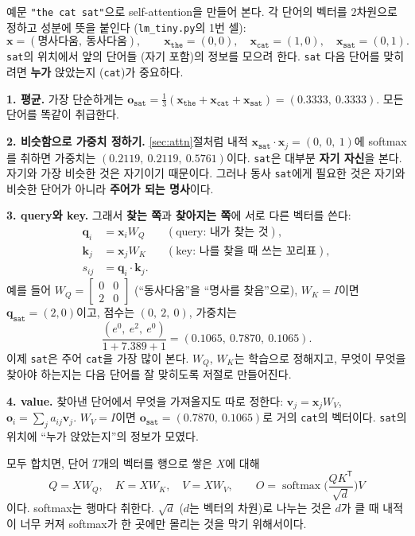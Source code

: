 \documentclass[11pt,a4paper]{article}
\newcommand{\vect}[1]{\bm{#1}}
\newcommand{\T}{^{\mathsf T}}
\newcommand{\softmax}{\operatorname{softmax}}
\newcommand{\w}[1]{\texttt{#1}}
\begin{document}
예문 \w{"the cat sat"}으로 self-attention을 만들어 본다. 각 단어의 벡터를 $2$차원으로 정하고 성분에 뜻을 붙인다 (\texttt{lm\_tiny.py}의 1번 셀):
\begin{equation}
\vect x=(\text{명사다움},\ \text{동사다움}),\qquad
\vect x_{\w{the}}=(0,0),\quad \vect x_{\w{cat}}=(1,0),\quad \vect x_{\w{sat}}=(0,1).
\end{equation}
\w{sat}의 위치에서 앞의 단어들 (자기 포함)의 정보를 모으려 한다. \w{sat} 다음 단어를 맞히려면 \textbf{누가} 앉았는지 (\w{cat})가 중요하다.

\textbf{1. 평균.} 가장 단순하게는 $\vect o_{\w{sat}}=\tfrac13(\vect x_{\w{the}}+\vect x_{\w{cat}}+\vect x_{\w{sat}})=(0.3333,\ 0.3333)$. 모든 단어를 똑같이 취급한다.

\textbf{2. 비슷함으로 가중치 정하기.} \ref{sec:attn}절처럼 내적 $\vect x_{\w{sat}}\cdot\vect x_j=(0,\ 0,\ 1)$에 softmax를 취하면 가중치는 $(0.2119,\ 0.2119,\ 0.5761)$이다.
\w{sat}은 대부분 \textbf{자기 자신}을 본다. 자기와 가장 비슷한 것은 자기이기 때문이다.
그러나 동사 \w{sat}에게 필요한 것은 자기와 비슷한 단어가 아니라 \textbf{주어가 되는 명사}이다.

\textbf{3. query와 key.} 그래서 \textbf{찾는 쪽}과 \textbf{찾아지는 쪽}에 서로 다른 벡터를 쓴다:
\begin{align}
\vect q_i&=\vect x_iW_Q &&(\text{query: 내가 찾는 것}),\\
\vect k_j&=\vect x_jW_K &&(\text{key: 나를 찾을 때 쓰는 꼬리표}),\\
s_{ij}&=\vect q_i\cdot\vect k_j .
\end{align}
예를 들어 $W_Q=\begin{bmatrix}0&0\\2&0\end{bmatrix}$ (``동사다움''을 ``명사를 찾음''으로), $W_K=I$이면 $\vect q_{\w{sat}}=(2,0)$이고, 점수는 $(0,\ 2,\ 0)$, 가중치는
\begin{equation}
\frac{(e^0,\ e^2,\ e^0)}{1+7.389+1}=(0.1065,\ 0.7870,\ 0.1065).
\end{equation}
이제 \w{sat}은 주어 \w{cat}을 가장 많이 본다. $W_Q$, $W_K$는 학습으로 정해지고, 무엇이 무엇을 찾아야 하는지는 다음 단어를 잘 맞히도록 저절로 만들어진다.

\textbf{4. value.} 찾아낸 단어에서 무엇을 가져올지도 따로 정한다: $\vect v_j=\vect x_jW_V$, $\vect o_i=\sum_ja_{ij}\vect v_j$.
$W_V=I$이면 $\vect o_{\w{sat}}=(0.7870,\ 0.1065)$로 거의 \w{cat}의 벡터이다. \w{sat}의 위치에 ``누가 앉았는지''의 정보가 모였다.

모두 합치면, 단어 $T$개의 벡터를 행으로 쌓은 $X$에 대해
\begin{equation}
\boxed{\;Q=XW_Q,\quad K=XW_K,\quad V=XW_V,\qquad O=\softmax\!\Big(\frac{QK\T}{\sqrt d}\Big)V\;}\label{eq:self_attn}
\end{equation}
이다. softmax는 행마다 취한다. $\sqrt d$ ($d$는 벡터의 차원)로 나누는 것은 $d$가 클 때 내적이 너무 커져 softmax가 한 곳에만 몰리는 것을 막기 위해서이다.
\end{document}
